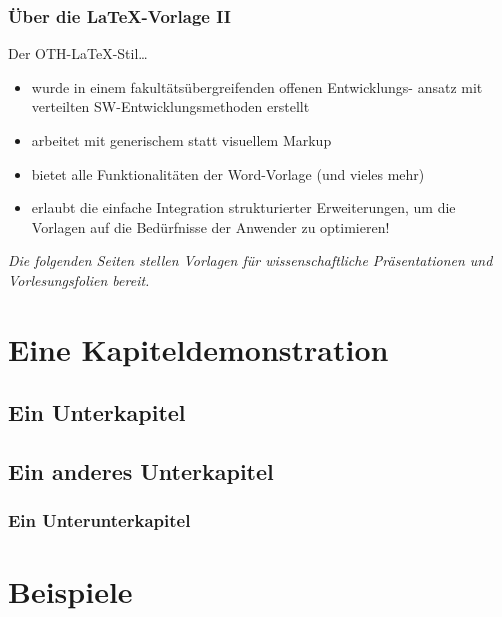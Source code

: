 \documentclass[aspectratio=169,16pt]{beamer}
\begin{document}
\begin{frame}
  \frametitle{Über die \LaTeX-Vorlage II}

  Der OTH-\LaTeX-Stil\dots

  \begin{itemize}
  \item wurde in einem fakultätsübergreifenden offenen
    Entwicklungs- ansatz mit verteilten SW-Entwicklungsmethoden erstellt
  \item arbeitet mit generischem statt visuellem Markup
  \item bietet alle Funktionalitäten der Word-Vorlage (und vieles mehr)
  \item erlaubt die einfache Integration strukturierter Erweiterungen,
    um die Vorlagen auf die Bedürfnisse der Anwender zu optimieren!
  \end{itemize}

  \emph{Die folgenden Seiten stellen Vorlagen für wissenschaftliche
    Präsentationen und Vorlesungsfolien bereit.}
\end{frame}


\section{Eine Kapiteldemonstration}

\subsection{Ein Unterkapitel}

\subsection{Ein anderes Unterkapitel}

\subsubsection{Ein Unterunterkapitel}

\section{Beispiele}
\frame{\tableofcontents[currentsection]}
\end{document}
